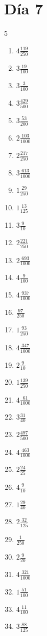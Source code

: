 \documentclass[12pt]{article}
\begin{document}
\section*{Día 7}
\begin{multicols}{5}\begin{enumerate}
		\item $ 4 \frac{119}{250} $
		\item $ 3 \frac{19}{100} $
		\item $ 3 \frac{3}{100} $
		\item $ 3 \frac{429}{500} $
		\item $ 3 \frac{53}{200} $
		\item $ 2 \frac{103}{1000} $
		\item $ 2 \frac{217}{250} $
		\item $ 3 \frac{613}{1000} $
		\item $ 1 \frac{29}{250} $
		\item $ 1 \frac{13}{125} $
		\item $ 3 \frac{9}{10} $
		\item $ 2 \frac{221}{250} $
		\item $ 2 \frac{693}{1000} $
		\item $ 4 \frac{9}{100} $
		\item $ 4 \frac{937}{1000} $
		\item $ \frac{97}{250} $
		\item $ 1 \frac{93}{250} $
		\item $ 4 \frac{347}{1000} $
		\item $ 2 \frac{9}{10} $
		\item $ 1 \frac{139}{250} $
		\item $ 4 \frac{61}{1000} $
		\item $ 3 \frac{31}{40} $
		\item $ 2 \frac{497}{500} $
		\item $ 4 \frac{463}{1000} $
		\item $ 2 \frac{24}{25} $
		\item $ 4 \frac{9}{10} $
		\item $ 1 \frac{29}{40} $
		\item $ 2 \frac{32}{125} $
		\item $ \frac{1}{250} $
		\item $ 2 \frac{9}{20} $
		\item $ 4 \frac{321}{1000} $
		\item $ 1 \frac{51}{100} $
		\item $ 4 \frac{11}{100} $
		\item $ 3 \frac{88}{125} $

\end{enumerate}
\end{multicols}
\end{document}
